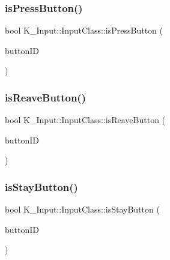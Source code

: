 \mbox{\label{class_k___input_1_1_input_class_a00bed6537b9106154e2a0d95c5cbcb2a}} 
\subsubsection{\texorpdfstring{is\+Press\+Button()}{isPressButton()}}
{\footnotesize\ttfamily bool K\+\_\+\+Input\+::\+Input\+Class\+::is\+Press\+Button (\begin{DoxyParamCaption}\item[{\mbox{\hyperlink{namespace_k___input_a2a6df758ee5a36c29d234fe7a27beb2c}{Button\+ID}}}]{button\+ID }\end{DoxyParamCaption})}

\mbox{\label{class_k___input_1_1_input_class_adbca1b70cc7ff5837aa6a9b8faa49aef}} 
\subsubsection{\texorpdfstring{is\+Reave\+Button()}{isReaveButton()}}
{\footnotesize\ttfamily bool K\+\_\+\+Input\+::\+Input\+Class\+::is\+Reave\+Button (\begin{DoxyParamCaption}\item[{\mbox{\hyperlink{namespace_k___input_a2a6df758ee5a36c29d234fe7a27beb2c}{Button\+ID}}}]{button\+ID }\end{DoxyParamCaption})}

\mbox{\label{class_k___input_1_1_input_class_a9fe656677b31caed0c4b23b8d22c99ed}} 
\subsubsection{\texorpdfstring{is\+Stay\+Button()}{isStayButton()}}
{\footnotesize\ttfamily bool K\+\_\+\+Input\+::\+Input\+Class\+::is\+Stay\+Button (\begin{DoxyParamCaption}\item[{\mbox{\hyperlink{namespace_k___input_a2a6df758ee5a36c29d234fe7a27beb2c}{Button\+ID}}}]{button\+ID }\end{DoxyParamCaption})}

